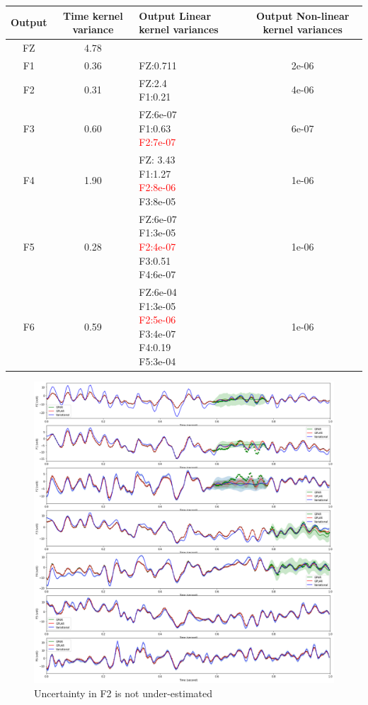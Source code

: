 \documentclass{article}
\begin{document}
\begin{center}
\begin{tabular}{c|c|l|c}
	\hline
	Output & Time kernel variance & Output Linear kernel variances & Output Non-linear kernel variances\\
	\hline
	FZ & 4.78\\
	\hline
	F1 & 0.36 & FZ:0.711  & 2e-06\\
	\hline
	F2 & 0.31 &  \makecell{FZ:2.4\\F1:0.21} & 4e-06\\
	\hline
	F3 & 0.60 &  \makecell{FZ:6e-07\\F1:0.63\\\textcolor{red}{F2:7e-07}} & 6e-07\\
	\hline
	F4 & 1.90 & \makecell{FZ: 3.43\\F1:1.27\\\textcolor{red}{F2:8e-06}\\F3:8e-05} & 1e-06\\
	\hline
	F5 & 0.28 & \makecell{FZ:6e-07\\F1:3e-05\\\textcolor{red}{F2:4e-07}\\F3:0.51\\F4:6e-07} & 1e-06\\
	\hline
	F6 & 0.59 & \makecell{FZ:6e-04\\F1:3e-05\\\textcolor{red}{F2:5e-06}\\F3:4e-07\\F4:0.19\\F5:3e-04} & 1e-06\\
	\hline
\end{tabular}
\end{center}



\begin{figure}[H]
\centering
\includegraphics[width=.8\linewidth]{eeg-bidirectional-5.png}
\caption{Uncertainty in F2 is not under-estimated}
\end{figure}
\end{document}
